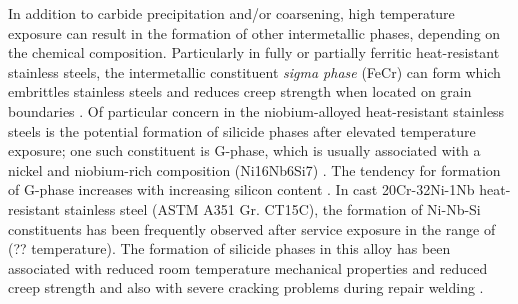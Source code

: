 In addition to carbide precipitation and/or coarsening, high temperature exposure can result in the formation of other intermetallic phases, depending on the chemical composition.  Particularly in fully or partially ferritic heat-resistant stainless steels, the intermetallic constituent \emph{sigma phase} (FeCr) can form which embrittles stainless steels and reduces creep strength when located on grain boundaries \cite{sourmail_precipitation_2001,avery_cast_1969}. Of particular concern in the niobium-alloyed heat-resistant stainless steels is the potential formation of silicide phases after elevated temperature exposure; one such constituent is G-phase, which is usually associated with a nickel and niobium-rich composition (Ni16Nb6Si7) \cite{sourmail_precipitation_2001}. The tendency for formation of G-phase increases with increasing silicon content \cite{ecob_formation_1987,pedro_ibanez_effects_1993}. In cast 20Cr-32Ni-1Nb heat-resistant stainless steel (ASTM A351 Gr. CT15C), the formation of Ni-Nb-Si constituents has been frequently observed after service exposure in the range of (?? temperature). The formation of silicide phases in this alloy has been associated with reduced room temperature mechanical properties and reduced creep strength \cite{shibasaki_experience_1994} and also with severe cracking problems during repair welding \cite{hoffman_weld_1998}.


